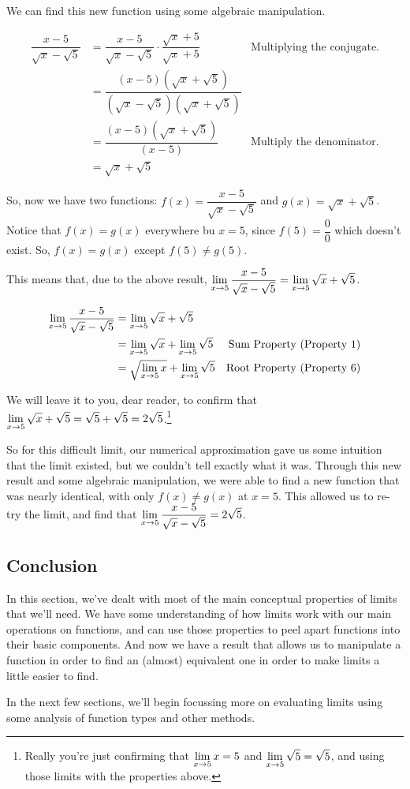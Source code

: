 We can find this new function using some algebraic manipulation.

\begin{align*}
  \dfrac{x-5}{\sqrt{x}-\sqrt{5}} & = \dfrac{x-5}{\sqrt{x}-\sqrt{5}} \cdot \dfrac{\sqrt{x}+5}{\sqrt{x}+5} & \text{Multiplying the conjugate.}\\
  & = \dfrac{(x-5)(\sqrt{x}+\sqrt{5})}{(\sqrt{x}-\sqrt{5})(\sqrt{x}+\sqrt{5})}\\
  & = \dfrac{(x-5)(\sqrt{x}+\sqrt{5})}{(x-5)} & \text{Multiply the denominator.}\\
  & = \sqrt{x}+\sqrt{5}
\end{align*}

So, now we have two functions: $f(x) = \dfrac{x-5}{\sqrt{x}-\sqrt{5}}$ and $g(x) = \sqrt{x}+\sqrt{5}$.
Notice that $f(x) = g(x)$ everywhere bu $x=5$, since $f(5) = \dfrac{0}{0}$ which doesn't exist.
So, $f(x) = g(x)$ except $f(5)\neq g(5)$.

This means that, due to the above result, $\displaystyle \lim_{x\to 5} \dfrac{x-5}{\sqrt{x}-\sqrt{5}} = \displaystyle \lim_{x\to 5} \sqrt{x}+\sqrt{5}$.

\begin{align*}
  \displaystyle \lim_{x\to 5} \dfrac{x-5}{\sqrt{x}-\sqrt{5}} &= \displaystyle \lim_{x\to 5} \sqrt{x}+\sqrt{5}\\
  & = \displaystyle \lim_{x\to 5} \sqrt{x} + \displaystyle \lim_{x\to 5} \sqrt{5} & \text{Sum Property (Property 1)}\\
  & = \sqrt{\displaystyle \lim_{x\to 5} x} + \displaystyle \lim_{x\to 5} \sqrt{5} & \text{Root Property (Property 6)}
\end{align*}

We will leave it to you, dear reader, to confirm that $\displaystyle \lim_{x\to 5} \sqrt{x}+\sqrt{5} = \sqrt{5} + \sqrt{5} = 2\sqrt{5}$.\footnote{Really you're just confirming that $\displaystyle \lim_{x\to 5} x = 5$ and $\displaystyle \lim_{x\to 5} \sqrt{5} = \sqrt{5}$, and using those limits with the properties above.}

So for this difficult limit, our numerical approximation gave us some intuition that the limit existed, but we couldn't tell exactly what it was.
Through this new result and some algebraic manipulation, we were able to find a new function that was nearly identical, with only $f(x)\neq g(x)$ at $x=5$.
This allowed us to re-try the limit, and find that $\displaystyle \lim_{x\to 5} \dfrac{x-5}{\sqrt{x}-\sqrt{5}} = 2\sqrt{5}$.

\subsection*{Conclusion}

In this section, we've dealt with most of the main conceptual properties of limits that we'll need.
We have some understanding of how limits work with our main operations on functions, and can use those properties to peel apart functions into their basic components.
And now we have a result that allows us to manipulate a function in order to find an (almost) equivalent one in order to make limits a little easier to find.

In the next few sections, we'll begin focussing more on evaluating limits using some analysis of function types and other methods.
